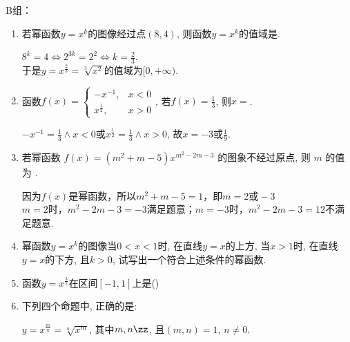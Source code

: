 B组：
\begin{enumerate}
\item 若幂函数$y=x^k$的图像经过点$(8,4)$, 则函数$y=x^k$的值域是\blkda{$[0,+\infty)$}. 
\begin{jieda}
$8^k=4\iff 2^{3k}=2^2\iff k=\frac{2}{3}$. \\
于是$y=x^{\frac{2}{3}}=\sqrt[3]{x^2}$的值域为$[0,+\infty)$. 
\end{jieda}

\item 函数$f(x)=\begin{cases}
-x^{-1}, & x<0\\
x^{\frac{1}{2}}, & x>0
\end{cases}$, 
若$f(x)=\frac{1}{3}$, 则$x=$. 
\begin{jieda}
$-x^{-1}=\frac{1}{3}\land x<0$或$x^{\frac{1}{2}}=\frac{1}{3}\land x>0$, 故$x=-3$或$\frac{1}{9}$. 
\end{jieda}

\item 若幂函数 $f(x)=\left(m^2+m-5\right) x^{m^2-2 m-3}$ 的图象不经过原点, 则 $m$ 的值为 .
\begin{jieda}
    因为$f(x)$是幂函数，所以$m^2+m-5 = 1$，即$m = 2 \mbox{或} -3$ \\
    $m = 2$时，$m^2-2 m-3 = -3$满足题意；$m = -3$时，$m^2-2 m-3 = 12$不满足题意.
\end{jieda}

\item 幂函数$y=x^k$的图像当$0<x<1$时, 在直线$y=x$的上方, 当$x>1$时, 在直线$y=x$的下方, 且$k>0$, 试写出一个符合上述条件的幂函数. 

\item 函数$y=x^{\frac{3}{5}}$在区间$[-1,1]$上是\dotfill()


\item 下列四个命题中, 正确的是: 
\begin{jieda}
$y=x^{\frac{m}{n}}=\sqrt[n]{x^m}$, 其中$m,n\zz$, 且$(m,n)=1$, $n\neq 0$. 
\end{jieda}


\end{enumerate}
